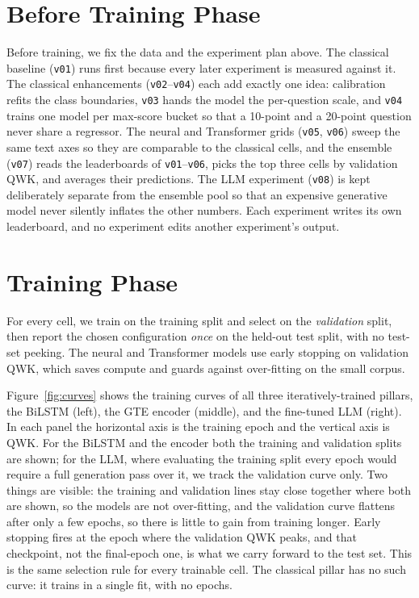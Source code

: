 \section{Before Training Phase}
\label{sec:before}
Before training, we fix the data and the experiment plan above. The classical baseline (\texttt{v01})
runs first because every later experiment is measured against it. The classical enhancements
(\texttt{v02}--\texttt{v04}) each add exactly one idea: calibration refits the class boundaries,
\texttt{v03} hands the model the per-question scale, and \texttt{v04} trains one model per max-score
bucket so that a 10-point and a 20-point question never share a regressor. The neural and Transformer
grids (\texttt{v05}, \texttt{v06}) sweep the same text axes so they are comparable to the classical
cells, and the ensemble (\texttt{v07}) reads the leaderboards of \texttt{v01}--\texttt{v06}, picks the
top three cells by validation QWK, and averages their predictions. The LLM experiment (\texttt{v08}) is
kept deliberately separate from the ensemble pool so that an expensive generative model never silently
inflates the other numbers. Each experiment writes its own leaderboard, and no experiment edits another
experiment's output.

\section{Training Phase}
\label{sec:training}
For every cell, we train on the training split and select on the \emph{validation} split, then report
the chosen configuration \emph{once} on the held-out test split, with no test-set peeking. The neural
and Transformer models use early stopping on validation QWK, which saves compute and guards against
over-fitting on the small corpus.

Figure~\ref{fig:curves} shows the training curves of all three iteratively-trained pillars, the BiLSTM
(left), the GTE encoder (middle), and the fine-tuned LLM (right). In each panel the horizontal axis is
the training epoch and the vertical axis is QWK. For the BiLSTM and the encoder both the training and
validation splits are shown; for the LLM, where evaluating the training split every epoch would require
a full generation pass over it, we track the validation curve only. Two things are visible: the
training and validation lines stay close together where both are shown, so the models are not
over-fitting, and the validation curve flattens after only a few epochs, so there is little to gain from
training longer. Early stopping fires at the epoch where the validation QWK peaks, and that checkpoint,
not the final-epoch one, is what we carry forward to the test set. This is the same selection rule for
every trainable cell. The classical pillar has no such curve: it trains in a single fit, with no epochs.

